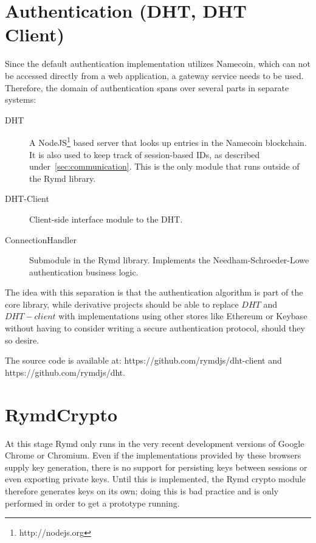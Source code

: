 \section{Authentication (DHT, DHT Client)}
\label{sec:authentication}
Since the default authentication implementation utilizes Namecoin, which can not be accessed directly from a web application, a gateway service needs to be used. Therefore, the domain of authentication spans over several parts in separate systems:

\begin{description}
  \item[DHT] A NodeJS\footnote{http://nodejs.org} based server that looks up entries in the Namecoin blockchain. It is also used to keep track of session-based IDs, as described under~\ref{sec:communication}. This is the only module that runs outside of the Rymd library.
  \item[DHT-Client] Client-side interface module to the DHT.
  \item[ConnectionHandler] Submodule in the Rymd library. Implements the Needham-Schroeder-Lowe authentication business logic.
\end{description}

The idea with this separation is that the authentication algorithm is part of the core library, while derivative projects should be able to replace $DHT$ and $DHT-client$ with implementations using other stores like Ethereum or Keybase without having to consider writing a secure authentication protocol, should they so desire.

The source code is available at: https://github.com/rymdjs/dht-client and https://github.com/rymdjs/dht.

\section{RymdCrypto}
\label{sec:cryptography}
At this stage Rymd only runs in the very recent development versions of Google Chrome or Chromium.
Even if the implementations provided by these browsers supply key generation, there is no support for persisting keys between sessions or even exporting private keys. Until this is implemented, the Rymd crypto module therefore generates keys on its own; doing this is bad practice and is only performed in order to get a prototype running.

